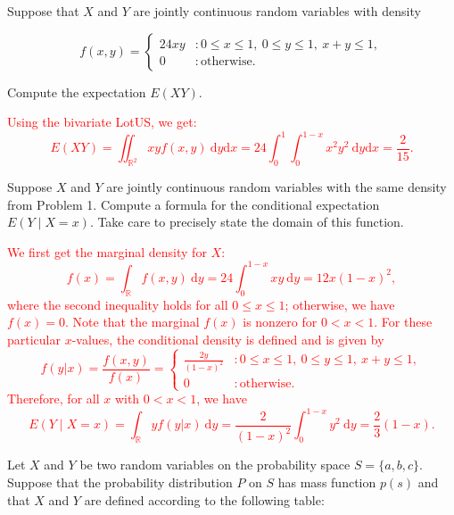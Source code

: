 \documentclass[12pt,reqno]{amsart}
\begin{document}
\bigskip

\prob Suppose that $X$ and $Y$ are jointly continuous random variables with density

	\[
	f(x,y) = \begin{cases}
	24xy & : 0\leq x \leq 1, \ 0 \leq y \leq 1, \ x+y \leq 1, \\
	0 & : \text{otherwise}.
	\end{cases}
	\]

Compute the expectation $E(XY)$.

\bigskip
\textcolor{red}{Using the bivariate LotUS, we get:
	\[E(XY) = \iint_{\mathbb{R}^2} xy f(x,y) \ \text{d}y\text{d}x = 24 \int_0^1 \int_0^{1-x} x^2y^2 \ \text{d}y\text{d}x = \frac{2}{15}.
	\]}
\bigskip














\prob Suppose $X$ and $Y$ are jointly continuous random variables with the same density from Problem 1. Compute a formula for the conditional expectation $E(Y\mid X=x)$. Take care to precisely state the domain of this function.

\bigskip
\textcolor{red}{We first get the marginal density for $X$:
	\[f(x) = \int_\mathbb{R} f(x,y) \ \text{d}y = 24\int_0^{1-x} xy \ \text{d}y = 12x(1-x)^2,
	\]
where the second inequality holds for all $0\leq x \leq 1$; otherwise, we have $f(x) =0$. Note that the marginal $f(x)$ is nonzero for $0<x<1$. For these particular $x$-values, the conditional density is defined and is given by
	\[
	f(y|x) = \frac{f(x,y)}{f(x)} = \begin{cases}
	\frac{2y}{(1-x)^2} & : 0\leq x \leq 1, \ 0 \leq y \leq 1, \ x+y \leq 1, \\
	0 & : \text{otherwise}.
	\end{cases}
	\]
Therefore, for all $x$ with $0 < x< 1$, we have
	\[E(Y \mid X=x) = \int_\mathbb{R} y f(y|x) \ \text{d}y = \frac{2}{(1-x)^2} \int_0^{1-x} y^2 \ \text{d}y = \frac{2}{3}(1-x).
	\]}
\bigskip

















\prob Let $X$ and $Y$ be two random variables on the probability space $S = \{a,b,c\}$. Suppose that the probability distribution $P$ on $S$ has mass function $p(s)$ and that $X$ and $Y$ are defined according to the following table:
\end{document}
